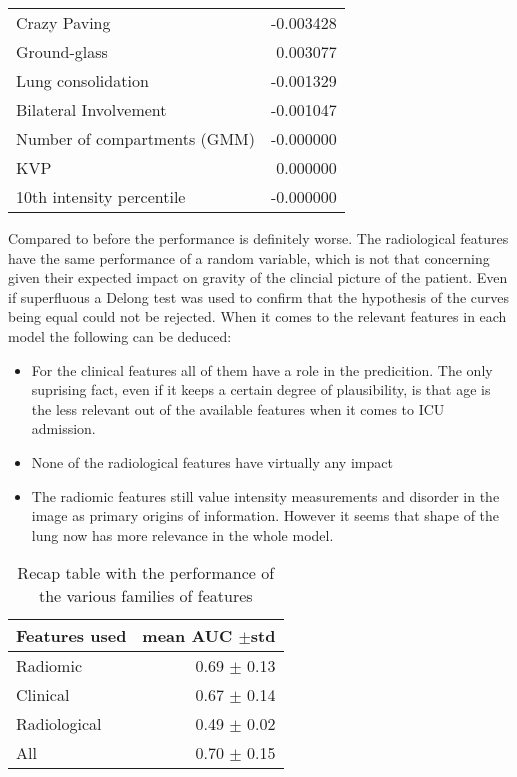 \begin{table}
\begin{tabular}{lr}
		Crazy Paving                        &                     -0.003428 \\
		Ground-glass                        &                      0.003077 \\
		Lung consolidation                  &                     -0.001329 \\
		Bilateral Involvement               &                     -0.001047 \\
		Number of compartments (GMM)        &                     -0.000000 \\
		KVP                                 &                      0.000000 \\
		10th intensity percentile           &                     -0.000000 \\
		\bottomrule
		\end{tabular}
\end{table}

Compared to before the performance is definitely worse. The radiological features have the same performance of a random variable, which is not that concerning given their expected impact on gravity of the clincial picture of the patient. Even if superfluous a Delong test was used to confirm that the hypothesis of the curves being equal could not be rejected. When it comes to the relevant features in each model the following can be deduced:

\begin{itemize}
\item For the clinical features all of them have a role in the predicition. The only suprising fact, even if it keeps a certain degree of plausibility, is that age is the less relevant out of the available features when it comes to ICU admission.
\item None of the radiological features have virtually any impact
\item The radiomic features still value intensity measurements and disorder in the image as primary origins of information. However it seems that shape of the lung now has more relevance in the whole model.
\end{itemize}

\begin{table}
\caption{Recap table with the performance of the various families of features \label{tab:RecapICU}}
\centering
\begin{tabular}{l|r}
\toprule
Features used & mean AUC $\pm$std\\
\midrule
Radiomic  & 0.69 $\pm$ 0.13\\
Clinical  &  0.67 $\pm$ 0.14\\
Radiological & 0.49 $\pm$ 0.02\\
All & 0.70 $\pm$ 0.15 \\
\bottomrule
\end{tabular}
\end{table}


